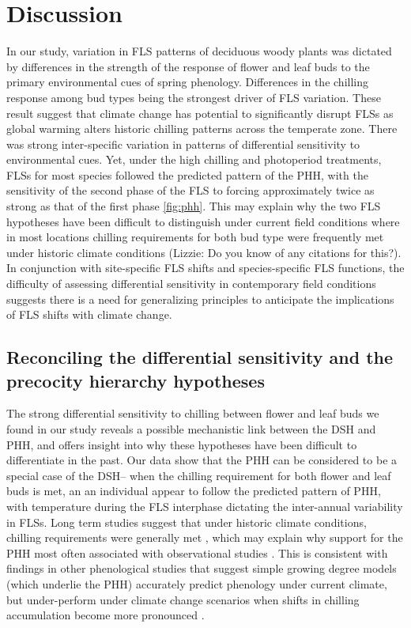 \documentclass[11pt]{article}
\begin{document}
\section*{Discussion}
\noindent In our study, variation in FLS patterns of deciduous woody plants was dictated by differences in the strength of the response of flower and leaf buds to the primary environmental cues of spring phenology. Differences in the chilling response among bud types being the strongest driver of FLS variation. These result suggest that climate change has potential to significantly disrupt FLSs as global warming alters historic chilling patterns across the temperate zone. There was strong inter-specific variation in patterns of differential sensitivity to environmental cues. Yet, under the high chilling and photoperiod treatments, FLSs for most species followed the predicted pattern of the PHH, with the sensitivity of the second phase of the FLS to forcing approximately twice as strong as that of the first phase \ref{fig:phh}. This may explain why the two FLS hypotheses have been difficult to distinguish under current field conditions where in most locations chilling requirements for both bud type were frequently met under historic climate conditions \citep{}(Lizzie: Do you know of any citations for this?). In conjunction with site-specific FLS shifts and species-specific FLS functions, the difficulty of assessing differential sensitivity in contemporary field conditions suggests there is a need for generalizing principles to  anticipate the implications of FLS shifts%
with climate change.

\subsection*{Reconciling the differential sensitivity and the precocity hierarchy hypotheses}
The strong differential sensitivity to chilling between flower and leaf buds we found in our study reveals a possible mechanistic link between the DSH and PHH, and offers insight into why these hypotheses have been difficult to differentiate in the past. Our data show that the PHH can be considered to be a special case of the DSH-- when the chilling requirement for both flower and leaf buds is met, an an individual appear to follow the predicted pattern of PHH, with temperature during the FLS interphase dictating the inter-annual variability in FLSs. Long term studies suggest that under historic climate conditions, chilling requirements were generally met \citep{}, which may explain why support for the PHH most often associated with observational studies \citep[e.g.][]{COSMULESCU:2020aa,Guo2014}. This is consistent with findings in other phenological studies that suggest simple growing degree models (which underlie the PHH) accurately predict phenology under current climate, but under-perform under climate change scenarios when shifts in chilling accumulation become more pronounced \citep{Linkosalo2008}.\\ 
\end{document}
